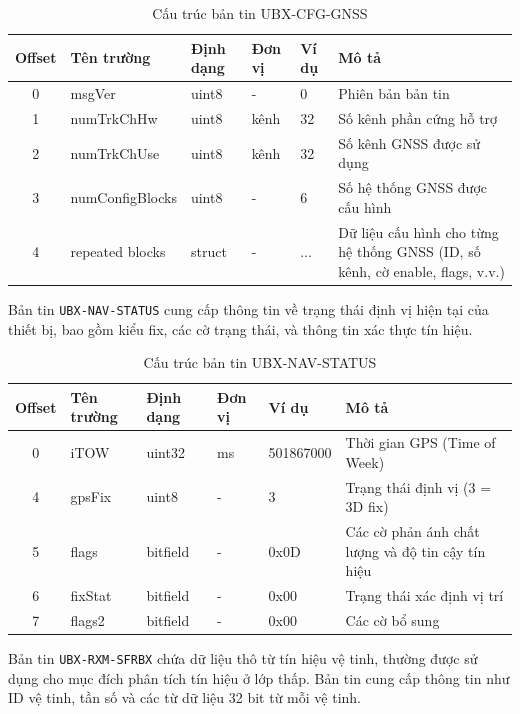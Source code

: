 \documentclass[../DoAn.tex]{subfiles}
\begin{document}
\begin{table}[H]
\centering
\begin{tabular}{|c|l|l|l|l|p{6cm}|}
\hline
\textbf{Offset} & \textbf{Tên trường} & \textbf{Định dạng} & \textbf{Đơn vị} & \textbf{Ví dụ} & \textbf{Mô tả} \\
\hline
0 & msgVer & uint8 & - & 0 & Phiên bản bản tin \\
\hline
1 & numTrkChHw & uint8 & kênh & 32 & Số kênh phần cứng hỗ trợ \\
\hline
2 & numTrkChUse & uint8 & kênh & 32 & Số kênh GNSS được sử dụng \\
\hline
3 & numConfigBlocks & uint8 & - & 6 & Số hệ thống GNSS được cấu hình \\
\hline
4 & repeated blocks & struct & - & ... & Dữ liệu cấu hình cho từng hệ thống GNSS (ID, số kênh, cờ enable, flags, v.v.) \\
\hline
\end{tabular}
\caption{Cấu trúc bản tin UBX-CFG-GNSS}
\end{table}

Bản tin \texttt{UBX-NAV-STATUS} cung cấp thông tin về trạng thái định vị hiện tại của thiết bị, bao gồm kiểu fix, các cờ trạng thái, và thông tin xác thực tín hiệu.

\begin{table}[H]
\centering
\begin{tabular}{|c|l|l|l|l|p{6cm}|}
\hline
\textbf{Offset} & \textbf{Tên trường} & \textbf{Định dạng} & \textbf{Đơn vị} & \textbf{Ví dụ} & \textbf{Mô tả} \\
\hline
0 & iTOW & uint32 & ms & 501867000 & Thời gian GPS (Time of Week) \\
\hline
4 & gpsFix & uint8 & - & 3 & Trạng thái định vị (3 = 3D fix) \\
\hline
5 & flags & bitfield & - & 0x0D & Các cờ phản ánh chất lượng và độ tin cậy tín hiệu \\
\hline
6 & fixStat & bitfield & - & 0x00 & Trạng thái xác định vị trí \\
\hline
7 & flags2 & bitfield & - & 0x00 & Các cờ bổ sung \\
\hline
\end{tabular}
\caption{Cấu trúc bản tin UBX-NAV-STATUS}
\end{table}

Bản tin \texttt{UBX-RXM-SFRBX} chứa dữ liệu thô từ tín hiệu vệ tinh, thường được sử dụng cho mục đích phân tích tín hiệu ở lớp thấp. Bản tin cung cấp thông tin như ID vệ tinh, tần số và các từ dữ liệu 32 bit từ mỗi vệ tinh.
\end{document}
